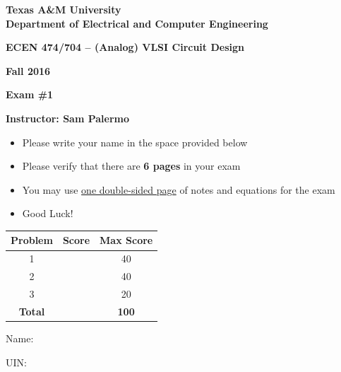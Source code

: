 \begingroup
\vspace*{1.15in}
\begin{center}
{\sffamily\bfseries\fontsize{16}{19}\selectfont Texas A\&M University\\
Department of Electrical and Computer Engineering\par}
\vspace{.38in}
{\sffamily\bfseries\fontsize{15}{18}\selectfont
ECEN 474/704 -- (Analog) VLSI Circuit Design\par}
\vspace{.38in}
{\sffamily\bfseries\fontsize{15}{18}\selectfont Fall 2016\par}
\vspace{.34in}
{\sffamily\bfseries\fontsize{15}{18}\selectfont Exam \#1\par}
\vspace{.34in}
{\sffamily\bfseries\fontsize{15}{18}\selectfont Instructor: Sam Palermo\par}
\end{center}
\vspace{.37in}
\begin{itemize}[leftmargin=.3in,itemsep=0pt,topsep=0pt]
\item Please write your name in the space provided below
\item Please verify that there are \textbf{6 pages} in your exam
\item You may use \underline{one double-sided page} of notes and equations for the exam
\item Good Luck!
\end{itemize}
\vspace{.58in}
\begin{tabular}{|c|c|c|}
\hline Problem&Score&Max Score\\\hline
1&&40\\\hline 2&&40\\\hline 3&&20\\\hline
\textbf{Total}&&\textbf{100}\\\hline
\end{tabular}
\vfill
Name:\ \hrulefill\par
\vspace{.11in}
UIN:\ \hrulefill
\vspace{.18in}
\newpage


